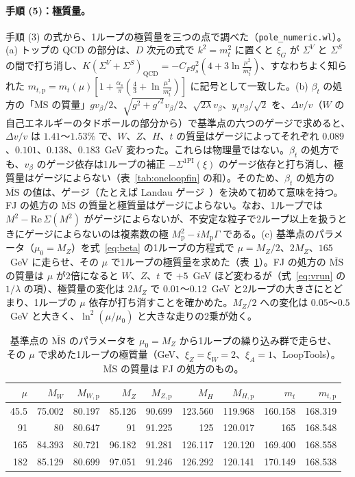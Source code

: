 \documentclass[a4paper,10pt]{ltjsarticle}
\newcommand{\MSbar}{\overline{\mathrm{MS}}}
\newcommand{\re}{\mathrm{Re}\,}
\begin{document}
\paragraph{手順 (5)：極質量。}手順 (3) の式から、1ループの極質量を三つの点で調べた（\texttt{pole\_numeric.wl}）。(a) トップの QCD の部分は、$D$ 次元の式で $k^2=m_t^2$ に置くと $\xi_G$ が $\Sigma^V$ と $\Sigma^S$ の間で打ち消し、$K(\Sigma^V+\Sigma^S)_{\mathrm{QCD}}=-C_Fg_s^2(4+3\ln\frac{\mu^2}{m_t^2})$、すなわちよく知られた $m_{t,\mathrm p}=m_t(\mu)[1+\frac{\alpha_s}{\pi}(\frac43+\ln\frac{\mu^2}{m_t^2})]$ に記号として一致した。(b) $\beta_t$ の処方の「$\MSbar$ の質量」$gv_\beta/2$、$\sqrt{g^2+g'^2}v_\beta/2$、$\sqrt{2\lambda}v_\beta$、$y_tv_\beta/\sqrt2$ を、$\Delta v/v$（$W$ の自己エネルギーのタドポールの部分から）で基準点の六つのゲージで求めると、$\Delta v/v$ は $1.41$〜$1.53\%$ で、$W$、$Z$、$H$、$t$ の質量はゲージによってそれぞれ $0.089$、$0.101$、$0.138$、$0.183$~GeV 変わった。これらは物理量ではない。$\beta_t$ の処方でも、$v_\beta$ のゲージ依存は1ループの補正 $-\Sigma^{\mathrm{1PI}}(\xi)$ のゲージ依存と打ち消し、極質量はゲージによらない（表~\ref{tab:oneloopfin} の和）。そのため、$\beta_t$ の処方の $\MSbar$ の値は、ゲージ（たとえば Landau ゲージ~\cite{mr19}）を決めて初めて意味を持つ。FJ の処方の $\MSbar$ の質量と極質量はゲージによらない。なお、1ループでは $M^2-\re\Sigma(M^2)$ がゲージによらないが、不安定な粒子で2ループ以上を扱うときにゲージによらないのは複素数の極 $M_{\mathrm p}^2-iM_{\mathrm p}\Gamma$ である。(c) 基準点のパラメータ（$\mu_0=M_Z$）を式~\eqref{eq:beta} の1ループの方程式で $\mu=M_Z/2$、$2M_Z$、$165$~GeV に走らせ、その $\mu$ で1ループの極質量を求めた（表~\ref{tab:polerg}）。FJ の処方の $\MSbar$ の質量は $\mu$ が2倍になると $W$、$Z$、$t$ で $+5$~GeV ほど変わるが（式~\eqref{eq:vrun} の $1/\lambda$ の項）、極質量の変化は $2M_Z$ で $0.01$〜$0.12$~GeV と2ループの大きさにとどまり、1ループの $\mu$ 依存が打ち消すことを確かめた。$M_Z/2$ への変化は $0.05$〜$0.5$~GeV と大きく、$\ln^2(\mu/\mu_0)$ と大きな走りの2乗が効く。

\begin{table}[tbp]
\centering\small
\caption{基準点の $\MSbar$ のパラメータを $\mu_0=M_Z$ から1ループの繰り込み群で走らせ、その $\mu$ で求めた1ループの極質量（GeV、$\xi_Z=\xi_W=2$、$\xi_A=1$、LoopTools）。$\MSbar$ の質量は FJ の処方のもの。}
\label{tab:polerg}
\begin{tabular}{rrrrrrrrr}
\toprule
$\mu$ & $M_W$ & $M_{W,\mathrm p}$ & $M_Z$ & $M_{Z,\mathrm p}$ & $M_H$ & $M_{H,\mathrm p}$ & $m_t$ & $m_{t,\mathrm p}$ \\
\midrule
45.5 & 75.002 & 80.197 & 85.126 & 90.699 & 123.560 & 119.968 & 160.158 & 168.319 \\
91 & 80 & 80.647 & 91 & 91.225 & 125 & 120.017 & 165 & 168.548 \\
165 & 84.393 & 80.721 & 96.182 & 91.281 & 126.117 & 120.120 & 169.400 & 168.558 \\
182 & 85.129 & 80.699 & 97.051 & 91.246 & 126.292 & 120.141 & 170.149 & 168.538 \\
\bottomrule
\end{tabular}
\end{table}
\end{document}
